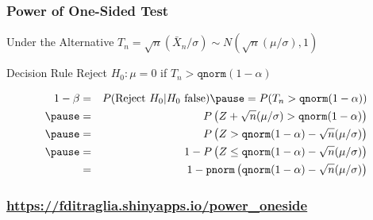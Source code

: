 \documentclass[handout]{beamer}
\begin{document}
\begin{frame}
	\frametitle{Power of One-Sided Test}
\small
\begin{block}
	{Under the Alternative}
	$T_n = \sqrt{n}(\bar{X}_n/\sigma) \sim N\left( \sqrt{n}(\mu/\sigma),1  \right)$
\end{block}
\begin{block}
	{Decision Rule}
	Reject $H_0\colon \mu = 0$ if $T_n> \texttt{qnorm}(1- \alpha)$  
\end{block}
\begin{eqnarray*}
	1 - \beta &=& P(\mbox{Reject } H_0|H_0 \mbox{ false}) \pause = P(T_n >\texttt{qnorm}(1- \alpha))\\ \pause
	&=& P \left( Z + \sqrt{n}(\mu/\sigma) > \texttt{qnorm}(1- \alpha)\right)\\ \pause
	&=& P \left( Z >    \texttt{qnorm}(1- \alpha)-\sqrt{n}(\mu/\sigma)\right)\\ \pause 
	&=& 1 - P \left( Z \leq  \texttt{qnorm}(1- \alpha)-\sqrt{n}(\mu/\sigma)\right) \\
	&=& 1 - \texttt{pnorm}\left( \texttt{qnorm}(1 - \alpha) - \sqrt{n}(\mu/\sigma) \right) 
\end{eqnarray*}

\end{frame}
\begin{frame}
	\frametitle{\href{https://fditraglia.shinyapps.io/power_twoside}{https://fditraglia.shinyapps.io/power\_oneside}}

\begin{figure}
\end{figure}

\end{frame}
\end{document}

